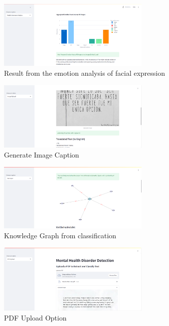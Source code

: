 \begin{figure}[h!]  
    \centering
    \includegraphics[width=0.65\textwidth]{App Images/12-1 Interface.png}  
    \caption{Result from the emotion analysis of facial expression}
    \label{10i23}  %
\end{figure}

\begin{figure}[h!]  
    \centering
    \includegraphics[width=0.65\textwidth]{App Images/18 Interface.png}  
    \caption{Generate Image Caption}
    \label{10i234}  %
\end{figure}   

\begin{figure}[h!]  
    \centering
    \includegraphics[width=0.65\textwidth]{App Images/19 Interface.png}  
    \caption{Knowledge Graph from classification}
    \label{10i23445}  %
\end{figure}  


\begin{figure}[h!]  
    \centering
    \includegraphics[width=0.65\textwidth]{App Images/20 Interface.png}  
    \caption{PDF Upload Option}
    \label{10i23445}  %
\end{figure}  


